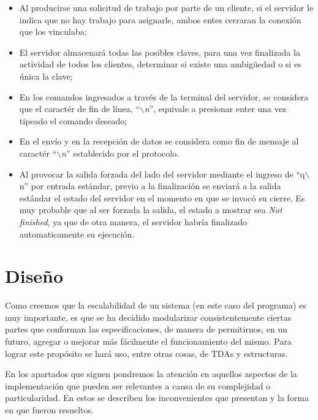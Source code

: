 \documentclass{article}
\begin{document}
\begin{itemize}
	\itemsep=3pt \topsep=0pt \partopsep=0pt \parskip=0pt \parsep=0pt

	\item Al producirse una solicitud de trabajo por parte de un cliente, si el servidor le indica que no hay trabajo para asignarle, ambos entes cerraran la conexión que los vinculaba;

	\item El servidor almacenará todas las posibles claves, para una vez finalizada la actividad de todos los clientes, determinar si existe una ambig\"uedad o si es única la clave;

	\item En los comandos ingresados a través de la terminal del servidor, se considera que el caractér de fin de línea, ``\textit{$\backslash$n}'', equivale a presionar enter una vez tipeado el comando deseado;

	\item En el envío y en la recepción de datos se considera como fin de mensaje al caractér ``\textit{$\backslash$n}'' establecido por el protocolo.

	\item Al provocar la salida forzada del lado del servidor mediante el ingreso de ``q$\backslash$n'' por entrada estándar, previo a la finalización se enviará a la salida estándar el estado del servidor en el momento en que se invocó su cierre. Es muy probable que al ser forzada la salida, el estado a mostrar sea \textit{Not finished}, ya que de otra manera, el servidor habría finalizado automaticamente su ejecución.
\end{itemize}
\medskip




\section{Diseño}

	Como creemos que la escalabilidad de un sistema (en este caso del programa) es muy importante, es que se ha decidido modularizar consistentemente ciertas partes que conforman las especificaciones, de manera de permitirnos, en un futuro, agregar o mejorar más fácilmente el funcionamiento del mismo. Para lograr este propósito se hará uso, entre otras cosas, de TDAs y estructuras.
	\par
	En los apartados que siguen pondremos la atención en aquellos aspectos de la implementación que pueden ser relevantes a causa de su complejidad o particularidad. En estos se describen los inconvenientes que presentan y la forma en que fueron resueltos.
\bigskip
\end{document}
